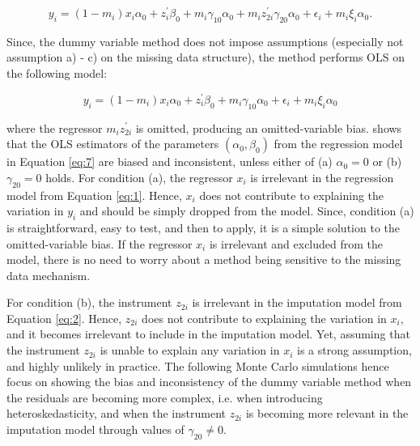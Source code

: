\begin{equation}\label{eq:6}
    y_i = (1-m_i) x_i \alpha_0 + z_i^{\prime} \beta_0 + m_i \gamma_{10} \alpha_0 + m_i z_{2i}^{\prime} \gamma_{20} \alpha_0 + \epsilon_i + m_i \xi_i \alpha_0.
\end{equation}

Since, the dummy variable method does not impose assumptions (especially not assumption a) - c) on the missing data structure), the method performs OLS on the following model:

\begin{equation}\label{eq:7}
    y_i = (1-m_i) x_i \alpha_0 + z_i^{\prime} \beta_0 + m_i \gamma_{10} \alpha_0 + \epsilon_i + m_i \xi_i \alpha_0
\end{equation}

where the regressor $m_i z_{2i}^{\prime}$ is omitted, producing an omitted-variable bias.
\citet{jones1996} shows that the OLS estimators of the parameters $(\alpha_0, \beta_0)$ from the regression model in Equation \eqref{eq:7} are biased and inconsistent, unless either of (a) $\alpha_0 = 0$ or (b) $\gamma_{20} = 0$ holds.
For condition (a), the regressor $x_i$ is irrelevant in the regression model from Equation \eqref{eq:1}.
Hence, $x_i$ does not contribute to explaining the variation in $y_i$ and should be simply dropped from the model.
Since, condition (a) is straightforward, easy to test, and then to apply, it is a simple solution to the omitted-variable bias.
If the regressor $x_i$ is irrelevant and excluded from the model, there is no need to worry about a method being sensitive to the missing data mechanism.

For condition (b), the instrument $z_{2i}$ is irrelevant in the imputation model from Equation \eqref{eq:2}.
Hence, $z_{2i}$ does not contribute to explaining the variation in $x_i$, and it becomes irrelevant to include in the imputation model.
Yet, assuming that the instrument $z_{2i}$ is unable to explain any variation in $x_i$ is a strong assumption, and highly unlikely in practice.
The following Monte Carlo simulations hence focus on showing the bias and inconsistency of the dummy variable method when the residuals are becoming more complex, i.e. when introducing heteroskedasticity, and when the instrument $z_{2i}$ is becoming more relevant in the imputation model through values of $\gamma_{20} \neq 0$.
